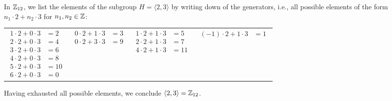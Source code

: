 \documentclass[../algebraNotesMSRI-UP2016.tex]{subfiles}
\begin{document}
\begin{frame}
\begin{ex}[cf. Problem 52]
In $\mathbb Z_{12}$, we list the elements of the subgroup $H=\langle 2,3\rangle$ by writing down  of the generators, i.e., all possible elements of the form $n_1\cdot 2+n_2\cdot 3$ for $n_1,n_2\in\mathbb Z$:

{\footnotesize
\begin{tabular}{p{}p{}p{}p{}}
{\begin{align*}
1\cdot 2 +0\cdot 3 &= 2 \\
2\cdot 2 +0\cdot 3 &= 4 \\
3\cdot 2 +0\cdot 3 &= 6 \\
4\cdot 2 +0\cdot 3 &= 8 \\
5\cdot 2 +0\cdot 3 &= 10 \\
6\cdot 2 +0\cdot 3 &= 0
\end{align*} 
} & 
{\begin{align*}
0\cdot 2 +1\cdot 3 &= 3 \\
0\cdot 2 +3\cdot 3 &= 9 
\end{align*}
} & 
{\begin{align*}
1\cdot 2 +1\cdot 3 &= 5 \\
2\cdot 2 +1\cdot 3 &= 7 \\
4\cdot 2 +1\cdot 3 &= 11
\end{align*} 
} &
{\begin{align*}
(-1)\cdot 2+1\cdot 3 &= 1
\end{align*}
}
\end{tabular}
}
Having exhausted all possible elements, we conclude $\langle 2,3\rangle=\mathbb Z_{12}$.
\end{ex}
\end{frame}

\begin{comment}
\answerKey
\begin{frame}{\subsecname}
\exeSol{exe:subgroupShortcut}

\qed
\end{frame}

\begin{frame}
\exeSol{exe:prob50}
\end{frame}

\begin{frame}{}
\exeSol{exe:cyclicSubgroup}

\qed
\end{frame}

\begin{frame}{}
\exeSol[(cf. Problem 51)]{exe:prob51}

\qed
\end{frame}
\end{comment}
\end{document}
